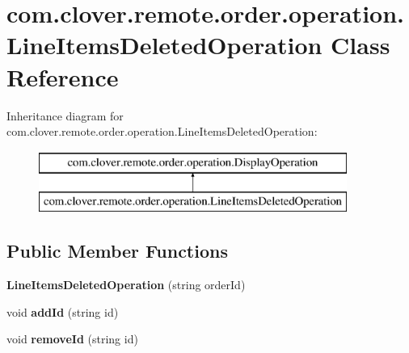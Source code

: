 \hypertarget{classcom_1_1clover_1_1remote_1_1order_1_1operation_1_1_line_items_deleted_operation}{}\section{com.\+clover.\+remote.\+order.\+operation.\+Line\+Items\+Deleted\+Operation Class Reference}
\label{classcom_1_1clover_1_1remote_1_1order_1_1operation_1_1_line_items_deleted_operation}
Inheritance diagram for com.\+clover.\+remote.\+order.\+operation.\+Line\+Items\+Deleted\+Operation\+:\begin{figure}[H]
\begin{center}
\leavevmode
\includegraphics[height=2.000000cm]{classcom_1_1clover_1_1remote_1_1order_1_1operation_1_1_line_items_deleted_operation}
\end{center}
\end{figure}
\subsection*{Public Member Functions}
\begin{DoxyCompactItemize}
\item 
\mbox{\label{classcom_1_1clover_1_1remote_1_1order_1_1operation_1_1_line_items_deleted_operation_a1c3c3eaf41eb729b208e616768013e66}} 
{\bfseries Line\+Items\+Deleted\+Operation} (string order\+Id)
\item 
\mbox{\label{classcom_1_1clover_1_1remote_1_1order_1_1operation_1_1_line_items_deleted_operation_ae29814df20de1e94123619181813bad1}} 
void {\bfseries add\+Id} (string id)
\item 
\mbox{\label{classcom_1_1clover_1_1remote_1_1order_1_1operation_1_1_line_items_deleted_operation_ac51fadd7e3568dd124613b8f864f849e}} 
void {\bfseries remove\+Id} (string id)
\end{DoxyCompactItemize}
